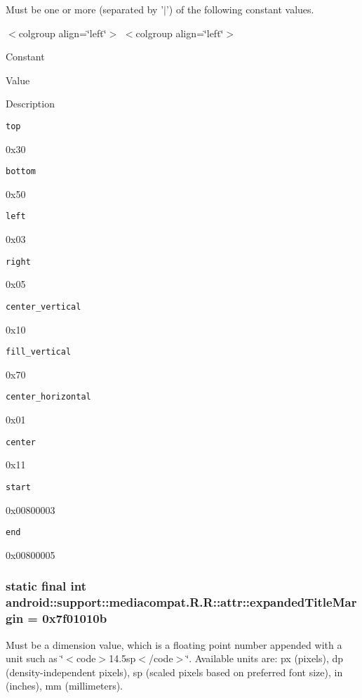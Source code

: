 Must be one or more (separated by '$|$') of the following constant values. \begin{TabularC}{0}
\hline
\end{TabularC}
$<$colgroup align=\char`\"{}left\char`\"{}$>$ $<$colgroup align=\char`\"{}left\char`\"{}$>$ 

Constant

Value

Description 

{\tt top}

0x30

{\tt bottom}

0x50

{\tt left}

0x03

{\tt right}

0x05

{\tt center\_\-vertical}

0x10

{\tt fill\_\-vertical}

0x70

{\tt center\_\-horizontal}

0x01

{\tt center}

0x11

{\tt start}

0x00800003

{\tt end}

0x00800005\hypertarget{classandroid_1_1support_1_1mediacompat_1_1_r_1_1attr_2a00a60276062145d00306849b41c972}{
\subsubsection[{expandedTitleMargin}]{\setlength{\rightskip}{0pt plus 5cm}static final int android::support::mediacompat.R.R::attr::expandedTitleMargin = 0x7f01010b}}
\label{classandroid_1_1support_1_1mediacompat_1_1_r_1_1attr_2a00a60276062145d00306849b41c972}


Must be a dimension value, which is a floating point number appended with a unit such as \char`\"{}$<$code$>$14.5sp$<$/code$>$\char`\"{}. Available units are: px (pixels), dp (density-independent pixels), sp (scaled pixels based on preferred font size), in (inches), mm (millimeters). 


